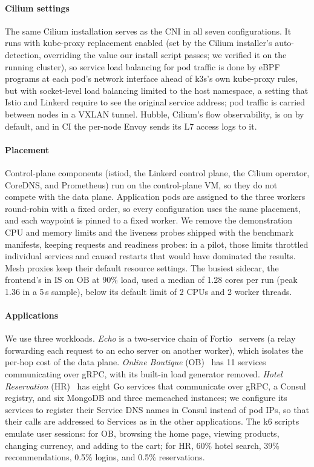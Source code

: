\paragraph{Cilium settings}
The same Cilium installation serves as the CNI in all seven configurations. It
runs with kube-proxy replacement enabled (set by the Cilium installer's
auto-detection, overriding the value our install script passes; we verified it
on the running cluster), so service load balancing for pod traffic is done by
eBPF programs at each pod's network interface ahead of k3s's own kube-proxy
rules, but with socket-level load
balancing limited to the host namespace, a setting that Istio and Linkerd
require to see the original service address; pod traffic is carried between
nodes in a VXLAN tunnel. Hubble, Cilium's flow observability, is on by
default, and in CI the per-node Envoy sends its L7 access logs to it.

\paragraph{Placement}
Control-plane components (istiod, the Linkerd control plane, the Cilium
operator, CoreDNS, and Prometheus) run on the control-plane VM, so they do not
compete with the data plane. Application pods are assigned to the three workers
round-robin with a fixed order, so every configuration uses the same placement,
and each waypoint is pinned to a fixed worker. We remove the demonstration CPU
and memory limits and the liveness probes shipped with the benchmark manifests,
keeping requests and readiness probes: in a pilot, those limits throttled
individual services and caused restarts that would have dominated the
results. Mesh proxies keep their default resource settings. The busiest sidecar, the
frontend's in IS on OB at 90\% load, used a median of 1.28 cores per run
(peak 1.36 in a 5\,s sample), below its default limit of 2 CPUs and 2 worker
threads.

\paragraph{Applications}
We use three workloads. \emph{Echo} is a two-service chain of Fortio~\cite{fortio}
servers (a relay forwarding each request to an echo server on another worker),
which isolates the per-hop cost of the data plane. \emph{Online Boutique}
(OB)~\cite{onlineboutique} has 11 services communicating over gRPC, with its
built-in load generator removed. \emph{Hotel Reservation}
(HR)~\cite{gan2019deathstarbench} has eight Go services that communicate over
gRPC, a Consul registry, and six MongoDB and three memcached instances; we
configure its services to register their Service DNS names in Consul instead
of pod IPs, so that their calls are addressed to Services as in the other
applications. The k6 scripts emulate user sessions: for OB, browsing the home
page, viewing products, changing currency, and adding to the cart; for HR, 60\%
hotel search, 39\% recommendations, 0.5\% logins, and 0.5\% reservations.

